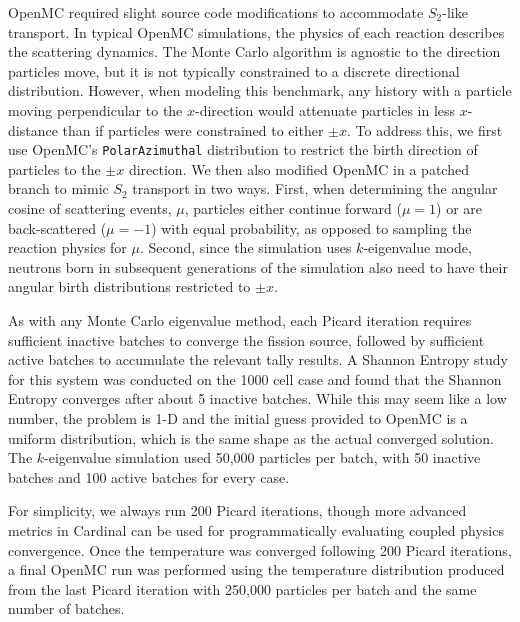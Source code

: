 \documentclass[letterpaper]{mc2023}
\begin{document}
OpenMC required slight source code modifications to accommodate $S_2$-like transport. In typical OpenMC simulations,
the physics of each reaction describes the scattering dynamics. The Monte Carlo algorithm is agnostic to the direction
particles move, but it is not typically constrained to a discrete directional distribution. However, when modeling this
benchmark, any history with a particle moving perpendicular to the $x$-direction would attenuate particles in less
$x$-distance than if particles were constrained to either $\pm x$. To address this, we first use OpenMC's \texttt{PolarAzimuthal}
distribution to restrict the birth direction of particles to the $\pm x$ direction. We then also modified OpenMC in a
patched branch to mimic $S_{2}$ transport in two ways. First, when determining the angular cosine of scattering events,
$\mu$, particles either continue forward ($\mu=1$) or are back-scattered ($\mu=-1$) with equal probability, as opposed to
sampling the reaction physics for $\mu$. Second, since the simulation uses $k$-eigenvalue mode, neutrons born in subsequent
generations of the simulation also need to have their angular birth distributions restricted to $\pm x$.

As with any Monte Carlo eigenvalue method, each Picard iteration requires sufficient inactive batches to converge the fission source,
followed by sufficient active batches to accumulate the relevant tally results. A Shannon Entropy \cite{brown-entropy-2006} study for
this system was conducted on the 1000 cell case and found that the Shannon Entropy converges after about 5 inactive batches. While this
may seem like a low number, the problem is 1-D and the initial guess provided to OpenMC is a uniform distribution, which is the same
shape as the actual converged solution. The $k$-eigenvalue simulation used 50,000 particles per batch, with 50 inactive batches and
100 active batches for every case.

For simplicity, we always run 200 Picard iterations, though more advanced metrics in Cardinal can be used for programmatically
evaluating coupled physics convergence. Once the temperature was converged following 200 Picard iterations, a final OpenMC run was
performed using the temperature distribution produced from the last Picard iteration with 250,000 particles per batch and the same
number of batches.
\end{document}
